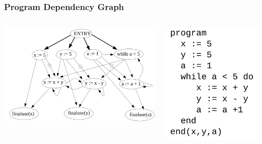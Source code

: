 \documentclass[10pt]{beamer}
\begin{document}
\begin{frame}\frametitle{Program Dependency Graph}
	\begin{columns}[C]
		\includegraphics[scale=0.4]{pdg_example.png}
		
		
		\centering
		\includegraphics[scale=0.3]{pdg_example2.png}
		
	\end{columns}
\end{frame}
\end{document}
